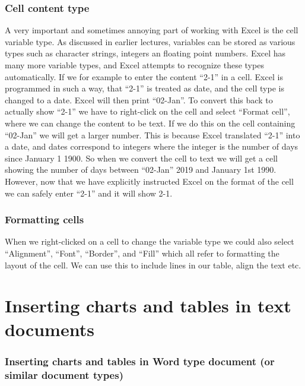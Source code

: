 \documentclass[]{book}
\begin{document}
\hypertarget{cell-content-type}{%
\subsubsection*{Cell content type}\label{cell-content-type}}

A very important and sometimes annoying part of working with Excel is the cell variable type. As discussed in earlier lectures, variables can be stored as various types such as character strings, integers an floating point numbers. Excel has many more variable types, and Excel attempts to recognize these types automatically. If we for example to enter the content ``2-1'' in a cell. Excel is programmed in such a way, that ``2-1'' is treated as date, and the cell type is changed to a date. Excel will then print ``02-Jan''. To convert this back to actually show ``2-1'' we have to right-click on the cell and select ``Format cell'', where we can change the content to be text. If we do this on the cell containing ``02-Jan'' we will get a larger number. This is because Excel translated ``2-1'' into a date, and dates correspond to integers where the integer is the number of days since January 1 1900. So when we convert the cell to text we will get a cell showing the number of days between ``02-Jan'' 2019 and January 1st 1990. However, now that we have explicitly instructed Excel on the format of the cell we can safely enter ``2-1'' and it will show 2-1.

\hypertarget{formatting-cells}{%
\subsubsection*{Formatting cells}\label{formatting-cells}}

When we right-clicked on a cell to change the variable type we could also select ``Alignment'', ``Font'', ``Border'', and ``Fill'' which all refer to formatting the layout of the cell. We can use this to include lines in our table, align the text etc.

\hypertarget{inserting-charts-and-tables-in-text-documents}{%
\section{Inserting charts and tables in text documents}\label{inserting-charts-and-tables-in-text-documents}}

\hypertarget{inserting-charts-and-tables-in-word-type-document-or-similar-document-types}{%
\subsubsection*{Inserting charts and tables in Word type document (or similar document types)}\label{inserting-charts-and-tables-in-word-type-document-or-similar-document-types}}
\end{document}
